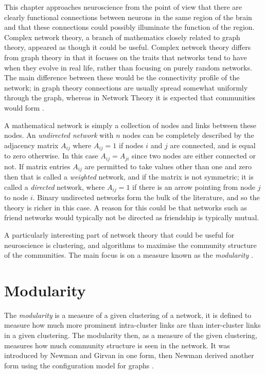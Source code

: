 
This chapter approaches neuroscience from the point of view that there are
clearly functional connections between neurons in the same region of the brain and
that these connections could possibly illuminate the function of the region.  Complex network theory, a branch 
of mathematics closely related to graph theory, appeared as though it could be useful. Complex network theory differs from 
graph theory in that it focuses on the traits that networks tend to have when they evolve in real life, rather than focusing on purely random networks.  
The main difference between these would be the connectivity profile of the 
network; in graph theory connections are usually spread somewhat uniformly 
through the graph, whereas in Network Theory it is  expected that communities would form \citep{Newman2010a}.

A mathematical network is simply a collection of nodes and links between
these nodes.  An \emph{undirected network} with $n$ nodes can be
completely described by the adjacency matrix $A_{ij}$ where $A_{ij} =
1$ if nodes $i$ and $j$ are connected, and is equal to zero otherwise. In this 
case $A_{ij} = A_{ji}$ since two nodes are either connected or
not.  If matrix entries $A_{ij}$ are permitted to take values other than one and zero
then that is called a \emph{weighted} network, and if the matrix is not symmetric; it is called a \emph{directed} network, where $A_{ij} = 1$ if there 
is an arrow pointing from node $j$ to node $i$.   Binary undirected networks form the bulk of the literature, and so the theory is richer
in this case. A reason for this could be that networks such as friend networks \citep{Zachary1977a} would typically not be directed as friendship is typically mutual.

A particularly interesting part of network theory that could be useful for
neuroscience is clustering, and algorithms to maximise the community structure of the communities.  The main focus is on a measure known as the
\emph{modularity} \citep{NewmanGirvan2004a}.

\section{Modularity}

The \emph{modularity} is a measure of a given clustering of a network,  it is defined to measure how much more prominent
intra-cluster links are than inter-cluster links in a given
clustering. The modularity then, as a measure of the given clustering, measures how much community structure is seen in the network.  It was introduced by Newman and Girvan \citet{NewmanGirvan2004a} in one form, then Newman \citet{Newman2006b, Newman2006a} derived another form using the configuration model for graphs \citep{BenderCanfield1978a,Bollobas1980a}.


